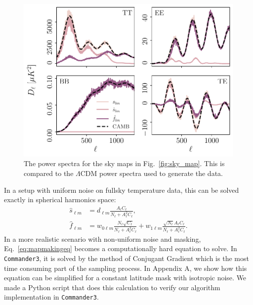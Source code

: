 \documentclass[twocolumn]{../common/aa}
\def\commanderthree{\texttt{Commander3}}
\begin{document}
\begin{figure}
	\centering
	\includegraphics[width=\linewidth]{figures/sigma_ell.pdf}
	\caption{\label{fig:sigma_ell}The power spectra for the sky maps in Fig.~\ref{fig:sky_map}. This is compared to the $\Lambda$CDM power spectra used to generate the data.}
\end{figure}

In a setup with uniform noise on fullsky temperature data, this can be solved exactly in spherical harmonics space:
\begin{align}
    \label{eq:hat_s_approx}
    \hat{s}_{\ell m} &= d_{\ell m}\frac{A_{\ell}C_{\ell}}{N_\ell + A_{\ell}^2C_{\ell}},\\
    \label{eq:hat_f_approx}
    \hat{f}_{\ell m} &= w_{0\ell m}\frac{N_{\ell}\sqrt{C_{\ell}}}{N_\ell + A_{\ell}^2C_{\ell}}+w_{1\ell m}\frac{\sqrt{N_{\ell}}A_{\ell}C_\ell}{N_\ell + A_{\ell}^2C_{\ell}}.
\end{align}
In a more realistic scenario with non-uniform noise and masking, Eq.~\eqref{eq:mapmakingeq} becomes a computationally hard equation to solve. In \commanderthree, it is solved by the method of Conjugant Gradient which is the most time consuming part of the sampling process. In Appendix A, we show how this equation can be simplified for a constant latitude mask with isotropic noise. We made a Python script that does this calculation to verify our algorithm implementation in \commanderthree.
\end{document}
